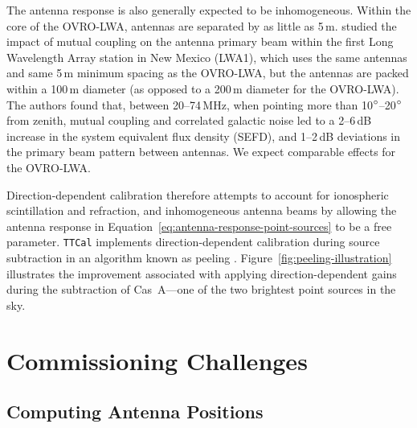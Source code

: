 \begin{bibunit}
The antenna response is also generally expected to be inhomogeneous.  Within the core of the
OVRO-LWA, antennas are separated by as little as 5\,m.  \citet{2011ITAP...59.1855E} studied the
impact of mutual coupling on the antenna primary beam within the first Long Wavelength Array station
in New Mexico (LWA1), which uses the same antennas and same 5\,m minimum spacing as the OVRO-LWA,
but the antennas are packed within a 100\,m diameter (as opposed to a 200\,m diameter for the
OVRO-LWA). The authors found that, between 20--74\,MHz, when pointing more than
10$\mbox{$^\circ$}$--20$\mbox{$^\circ$}$ from zenith, mutual coupling and correlated galactic noise led to a
2--6\,dB increase in the system equivalent flux density (SEFD), and 1--2\,dB deviations in the
primary beam pattern between antennas. We expect comparable effects for the OVRO-LWA.

Direction-dependent calibration therefore attempts to account for ionospheric scintillation and
refraction, and inhomogeneous antenna beams by allowing the antenna response in
Equation~\ref{eq:antenna-response-point-sources} to be a free parameter.  \texttt{TTCal} implements
direction-dependent calibration during source subtraction in an algorithm known as peeling
\citep{2008ISTSP...2..707M}. Figure~\ref{fig:peeling-illustration} illustrates the improvement
associated with applying direction-dependent gains during the subtraction of Cas~A---one of the two
brightest point sources in the sky.

\section{Commissioning Challenges}
\label{sec:commissioning-challenges}

\subsection{Computing Antenna Positions}


\end{bibunit}

